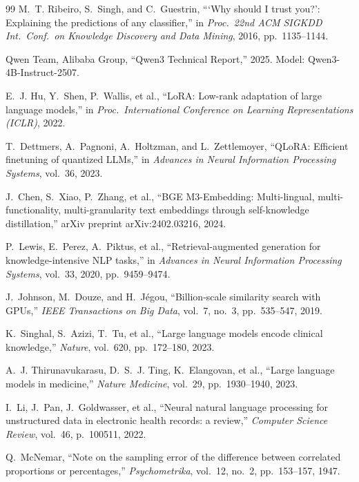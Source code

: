 \begin{thebibliography}{99}
M.~T. Ribeiro, S.~Singh, and C.~Guestrin,
```Why should I trust you?': Explaining the predictions of any classifier,''
in \emph{Proc.\ 22nd ACM SIGKDD Int.\ Conf.\ on Knowledge Discovery and Data
Mining}, 2016, pp.~1135--1144.

Qwen Team, Alibaba Group,
``Qwen3 Technical Report,'' 2025. Model: Qwen3-4B-Instruct-2507.

E.~J. Hu, Y.~Shen, P.~Wallis, et al.,
``LoRA: Low-rank adaptation of large language models,''
in \emph{Proc.\ International Conference on Learning Representations (ICLR)},
2022.

T.~Dettmers, A.~Pagnoni, A.~Holtzman, and L.~Zettlemoyer,
``QLoRA: Efficient finetuning of quantized LLMs,''
in \emph{Advances in Neural Information Processing Systems}, vol.~36, 2023.

J.~Chen, S.~Xiao, P.~Zhang, et al.,
``BGE M3-Embedding: Multi-lingual, multi-functionality, multi-granularity text
embeddings through self-knowledge distillation,''
arXiv preprint arXiv:2402.03216, 2024.

P.~Lewis, E.~Perez, A.~Piktus, et al.,
``Retrieval-augmented generation for knowledge-intensive NLP tasks,''
in \emph{Advances in Neural Information Processing Systems}, vol.~33, 2020,
pp.~9459--9474.

J.~Johnson, M.~Douze, and H.~J\'{e}gou,
``Billion-scale similarity search with GPUs,''
\emph{IEEE Transactions on Big Data}, vol.~7, no.~3, pp.~535--547, 2019.

K.~Singhal, S.~Azizi, T.~Tu, et al.,
``Large language models encode clinical knowledge,''
\emph{Nature}, vol.~620, pp.~172--180, 2023.

A.~J. Thirunavukarasu, D.~S.~J. Ting, K.~Elangovan, et al.,
``Large language models in medicine,''
\emph{Nature Medicine}, vol.~29, pp.~1930--1940, 2023.

I.~Li, J.~Pan, J.~Goldwasser, et al.,
``Neural natural language processing for unstructured data in electronic health
records: a review,''
\emph{Computer Science Review}, vol.~46, p.~100511, 2022.

Q.~McNemar,
``Note on the sampling error of the difference between correlated proportions or
percentages,''
\emph{Psychometrika}, vol.~12, no.~2, pp.~153--157, 1947.


\end{thebibliography}
